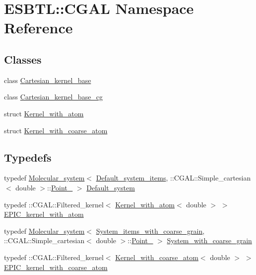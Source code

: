 \hypertarget{namespaceESBTL_1_1CGAL}{}\section{E\+S\+B\+TL\+:\+:C\+G\+AL Namespace Reference}
\label{namespaceESBTL_1_1CGAL}
\subsection*{Classes}
\begin{DoxyCompactItemize}
\item 
class \hyperlink{classESBTL_1_1CGAL_1_1Cartesian__kernel__base}{Cartesian\+\_\+kernel\+\_\+base}
\item 
class \hyperlink{classESBTL_1_1CGAL_1_1Cartesian__kernel__base__cg}{Cartesian\+\_\+kernel\+\_\+base\+\_\+cg}
\item 
struct \hyperlink{structESBTL_1_1CGAL_1_1Kernel__with__atom}{Kernel\+\_\+with\+\_\+atom}
\item 
struct \hyperlink{structESBTL_1_1CGAL_1_1Kernel__with__coarse__atom}{Kernel\+\_\+with\+\_\+coarse\+\_\+atom}
\end{DoxyCompactItemize}
\subsection*{Typedefs}
\begin{DoxyCompactItemize}
\item 
typedef \hyperlink{classESBTL_1_1Molecular__system}{Molecular\+\_\+system}$<$ \hyperlink{structESBTL_1_1Default__system__items}{Default\+\_\+system\+\_\+items}, \+::C\+G\+A\+L\+::\+Simple\+\_\+cartesian$<$ double $>$\+::\hyperlink{classESBTL_1_1Point__3}{Point\+\_} $>$ \hyperlink{namespaceESBTL_1_1CGAL_a0d1fd18cc9360ce0ba0cc2ea2ed8be68}{Default\+\_\+system}
\item 
typedef \+::C\+G\+A\+L\+::\+Filtered\+\_\+kernel$<$ \hyperlink{structESBTL_1_1CGAL_1_1Kernel__with__atom}{Kernel\+\_\+with\+\_\+atom}$<$ double $>$ $>$ \hyperlink{namespaceESBTL_1_1CGAL_ac13df3c9add4e34942e608f17fb6971c}{E\+P\+I\+C\+\_\+kernel\+\_\+with\+\_\+atom}
\item 
typedef \hyperlink{classESBTL_1_1Molecular__system}{Molecular\+\_\+system}$<$ \hyperlink{structESBTL_1_1System__items__with__coarse__grain}{System\+\_\+items\+\_\+with\+\_\+coarse\+\_\+grain}, \+::C\+G\+A\+L\+::\+Simple\+\_\+cartesian$<$ double $>$\+::\hyperlink{classESBTL_1_1Point__3}{Point\+\_} $>$ \hyperlink{namespaceESBTL_1_1CGAL_a3c029e52b1d0fd721493a259336696db}{System\+\_\+with\+\_\+coarse\+\_\+grain}
\item 
typedef \+::C\+G\+A\+L\+::\+Filtered\+\_\+kernel$<$ \hyperlink{structESBTL_1_1CGAL_1_1Kernel__with__coarse__atom}{Kernel\+\_\+with\+\_\+coarse\+\_\+atom}$<$ double $>$ $>$ \hyperlink{namespaceESBTL_1_1CGAL_a3e9468c7a5fd8e3d29abdfaa53ecd55d}{E\+P\+I\+C\+\_\+kernel\+\_\+with\+\_\+coarse\+\_\+atom}
\end{DoxyCompactItemize}


